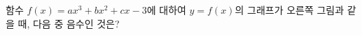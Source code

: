 \noindent\begin{minipage}[t]{0.58\linewidth}\vspace{0pt}\raggedright 함수 $f(x)=ax^3+bx^2+cx-3$에 대하여 $y=f(x)$의 그래프가 오른쪽 그림과 같을 때, 다음 중 음수인 것은? \end{minipage}\hfill\begin{minipage}[t]{0.4\linewidth}\vspace{0pt}\centering \resizebox{\ifdim\width>\linewidth\linewidth\else\width\fi}{!}{}\end{minipage}\par
{}
